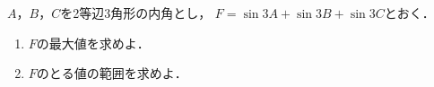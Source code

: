 \documentclass[../../main.tex]{subfiles}
\begin{document}
$A$，$B$，$C$を2等辺3角形の内角とし，
$F=\sin3A+\sin3B+\sin3C$とおく．
\begin{enumerate}
  \item $F$の最大値を求めよ．
  \item $F$のとる値の範囲を求めよ．
\end{enumerate}
\end{document}
